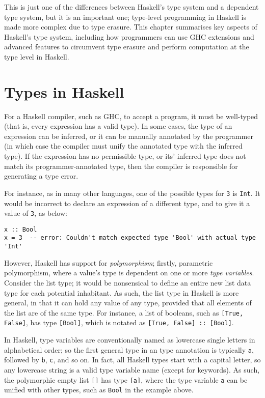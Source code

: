 \documentclass[12pt, a4paper, bibliography=totocnumbered]{scrreprt}
\newcommand{\inline}[1]{\lstinline[basicstyle=\ttfamily\footnotesize]{#1}}
\begin{document}
This is just one of the differences between Haskell's type system and a dependent type system, but it is an important one; type-level programming in Haskell is made more complex due to type erasure. This chapter summarises key aspects of Haskell's type system, including how programmers can use GHC extensions and advanced features to circumvent type erasure and perform computation at the type level in Haskell.

\section{Types in Haskell}

For a Haskell compiler, such as GHC, to accept a program, it must be well-typed (that is, every expression has a valid type). In some cases, the type of an expression can be inferred, or it can be manually annotated by the programmer (in which case the compiler must unify the annotated type with the inferred type). If the expression has no permissible type, or its' inferred type does not match its programmer-annotated type, then the compiler is responsible for generating a type error.

For instance, as in many other languages, one of the possible types for \inline{3} is \inline{Int}. It would be incorrect to declare an expression of a different type, and to give it a value of \inline{3}, as below:

\begin{lstlisting}
x :: Bool
x = 3  -- error: Couldn't match expected type 'Bool' with actual type 'Int'
\end{lstlisting}

However, Haskell has support for \emph{polymorphism}; firstly, parametric polymorphism, where a value's type is dependent on one or more \emph{type variables}. Consider the list type; it would be nonsensical to define an entire new list data type for each potential inhabitant. As such, the list type in Haskell is more general, in that it can hold any value of any type, provided that all elements of the list are of the same type. For instance, a list of booleans, such as \inline{[True, False]}, has type \inline{[Bool]}, which is notated as \inline{[True, False] :: [Bool]}.

In Haskell, type variables are conventionally named as lowercase single letters in alphabetical order; so the first general type in an type annotation is typically \inline{a}, followed by \inline{b}, \inline{c}, and so on. In fact, all Haskell types start with a capital letter, so any lowercase string is a valid type variable name (except for keywords). As such, the polymorphic empty list \inline{[]} has type \inline{[a]}, where the type variable \inline{a} can be unified with other types, such as \inline{Bool} in the example above.
\end{document}
